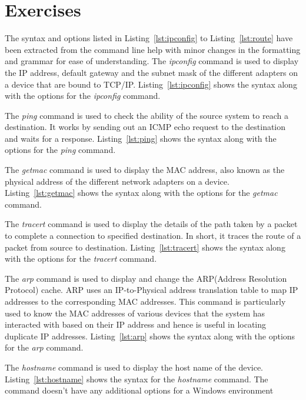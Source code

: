 \documentclass{lab_sheet}
\newcommand{\syntax}[1]{
    
}
\begin{document}
    \section{Exercises}
    The syntax and options listed in Listing~\ref{lst:ipconfig} to Listing~\ref{lst:route} have been extracted from the command line help with minor changes in the formatting and grammar for ease of understanding.
    The \textit{ipconfig} command is used to display the IP address, default gateway and the subnet mask of the different adapters on a device that are bound to TCP/IP. Listing~\ref{lst:ipconfig} shows the syntax along with the options for the \textit{ipconfig} command.
    \syntax{ipconfig}
    The \textit{ping} command is used to check the ability of the source system to reach a destination. It works by sending out an ICMP echo request to the destination and waits for a response. Listing~\ref{lst:ping} shows the syntax along with the options for the \textit{ping} command.
    \syntax{ping}
    The \textit{getmac} command is used to display the MAC address, also known as the physical address of the different network adapters on a device. Listing~\ref{lst:getmac} shows the syntax along with the options for the \textit{getmac} command.
    \syntax{getmac}
    The \textit{tracert} command is used to display the details of the path taken by a packet to complete a connection to specified destination. In short, it traces the route of a packet from source to destination. Listing~\ref{lst:tracert} shows the syntax along with the options for the \textit{tracert} command.
    \syntax{tracert}
    The \textit{arp} command is used to display and change the ARP(Address Resolution Protocol) cache. ARP uses an IP-to-Physical address translation table to map IP addresses to the corresponding MAC addresses. This command is particularly used to know the MAC addresses of various devices that the system has interacted with based on their IP address and hence is useful in locating duplicate IP addresses. Listing~\ref{lst:arp} shows the syntax along with the options for the \textit{arp} command.
    \syntax{arp}
    The \textit{hostname} command is used to display the host name of the device.  Listing~\ref{lst:hostname} shows the syntax for the \textit{hostname} command. The command doesn't have any additional options for a Windows environment
    \syntax{hostname}
\end{document}
